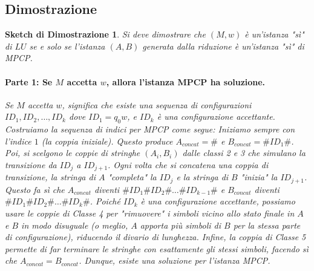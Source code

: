 \documentclass[a4paper, 11pt]{book} %
\newtheorem{proof_sketch}[theorem]{Sketch di Dimostrazione}
\theoremstyle{definition}
\begin{document}
\subsection{Dimostrazione}
\begin{proof_sketch}
Si deve dimostrare che $(M, w)$ è un'istanza "sì" di $LU$ se e solo se l'istanza $(A, B)$ generata dalla riduzione è un'istanza "sì" di MPCP.

\paragraph{Parte 1: Se $M$ accetta $w$, allora l'istanza MPCP ha soluzione.}
Se $M$ accetta $w$, significa che esiste una sequenza di configurazioni $ID_1, ID_2, \dots, ID_k$ dove $ID_1 = q_0 w$, e $ID_k$ è una configurazione accettante.
Costruiamo la sequenza di indici per MPCP come segue:
Iniziamo sempre con l'indice $1$ (la coppia iniziale). Questo produce $A_{concat} = \#$ e $B_{concat} = \#ID_1\#$.
Poi, si scelgono le coppie di stringhe $(A_i, B_i)$ dalle classi 2 e 3 che simulano la transizione da $ID_j$ a $ID_{j+1}$. Ogni volta che si concatena una coppia di transizione, la stringa di $A$ "completa" la $ID_j$ e la stringa di $B$ "inizia" la $ID_{j+1}$.
Questo fa sì che $A_{concat}$ diventi $\#ID_1\#ID_2\# \dots \#ID_{k-1}\#$ e $B_{concat}$ diventi $\#ID_1\#ID_2\# \dots \#ID_k\#$.
Poiché $ID_k$ è una configurazione accettante, possiamo usare le coppie di Classe 4 per "rimuovere" i simboli vicino allo stato finale in $A$ e $B$ in modo disuguale (o meglio, $A$ apporta più simboli di $B$ per la stessa parte di configurazione), riducendo il divario di lunghezza. Infine, la coppia di Classe 5 permette di far terminare le stringhe con esattamente gli stessi simboli, facendo sì che $A_{concat} = B_{concat}$.
Dunque, esiste una soluzione per l'istanza MPCP.


\end{proof_sketch}
\end{document}
